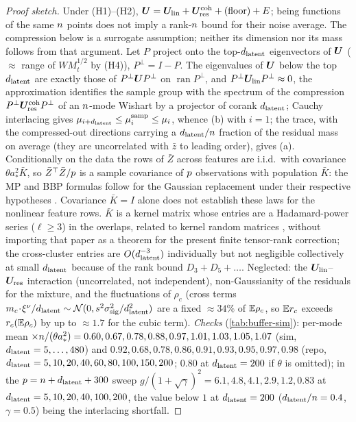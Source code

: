 \begin{proof}[Proof sketch]
Under (H1)--(H2), $\bm{U}=\bm{U}_{\rm lin}+\bm{U}^{\rm coh}_{\rm res}+(\text{floor})+E$; being functions of the same $n$ points does not imply a rank-$n$ bound for their noise average. The compression below is a surrogate assumption; neither its dimension nor its mass follows from that argument. Let $P$ project onto the top-$d_{\mathrm{latent}}$ eigenvectors of $\bm{U}$ ($\approx$ range of $WM_t^{1/2}$ by (H4)), $P^\perp=I-P$. The eigenvalues of $\bm{U}$ below the top $d_{\mathrm{latent}}$ are exactly those of $P^\perp\bm{U} P^\perp$ on $\operatorname{ran}P^\perp$, and $P^\perp\bm{U}_{\rm lin}P^\perp\approx0$, the approximation identifies the sample group with the spectrum of the compression $P^\perp\bm{U}^{\rm coh}_{\rm res}P^\perp$ of an $n$-mode Wishart by a projector of corank $d_{\mathrm{latent}}$; Cauchy interlacing gives $\mu_{i+d_{\mathrm{latent}}}\le\mu^{\rm samp}_i\le\mu_i$, whence (b) with $i=1$; the trace, with the compressed-out directions carrying a $d_{\mathrm{latent}}/n$ fraction of the residual mass on average (they are uncorrelated with $\bar z$ to leading order), gives (a). Conditionally on the data the rows of $\bar Z$ across features are i.i.d.\ with covariance $\theta a_*^2\bar K$, so $\bar Z^\top\bar Z/p$ is a sample covariance of $p$ observations with population $\bar K$: the MP and BBP formulas follow for the Gaussian replacement under their respective hypotheses \citep{couillet2011rmt,baik2005phase}. Covariance $\bar K=I$ alone does not establish these laws for the nonlinear feature rows. $\bar K$ is a kernel matrix whose entries are a Hadamard-power series ($\ell\ge3$) in the overlaps, related to kernel random matrices \citep{ELKaroui2010spectrum}, without importing that paper as a theorem for the present finite tensor-rank correction; the cross-cluster entries are $O(d_{\mathrm{latent}}^{-3})$ individually but not negligible collectively at small $d_{\mathrm{latent}}$ because of the rank bound $D_3+D_5+\dots$. Neglected: the $\bm{U}_{\rm lin}$--$\bm{U}_{\rm res}$ interaction (uncorrelated, not independent), non-Gaussianity of the residuals for the mixture, and the fluctuations of $\rho_c$ (cross terms $m_c\!\cdot\!\xi^\nu/d_{\mathrm{latent}}\sim\mathcal N(0,s^2\sigma_{\mathrm{sig}}^2/d_{\mathrm{latent}}^2)$ are a fixed $\approx34\%$ of $\mathbb{E}\rho_c$, so $\mathbb{E} r_c$ exceeds $r_c(\mathbb{E}\rho_c)$ by up to $\approx1.7$ for the cubic term). \emph{Checks} (\cref{tab:buffer-sim}): per-mode mean $\times n/(\theta a_*^2)=0.60,0.67,0.78,0.88,0.97,1.01,1.03,1.05,1.07$ (sim, $d_{\mathrm{latent}}=5,\dots,480$) and $0.92,0.68,0.78,0.86,0.91,0.93,0.95,0.97,0.98$ (repo, $d_{\mathrm{latent}}=5,10,20,40,60,80,100,150,200$; $0.80$ at $d_{\mathrm{latent}}=200$ if $\theta$ is omitted); in the $p=n+d_{\mathrm{latent}}+300$ sweep $g/(1+\sqrt\gamma)^2=6.1,4.8,4.1,2.9,1.2,0.83$ at $d_{\mathrm{latent}}=5,10,20,40,100,200$, the value below $1$ at $d_{\mathrm{latent}}=200$ ($d_{\mathrm{latent}}/n=0.4$, $\gamma=0.5$) being the interlacing shortfall.
\end{proof}

